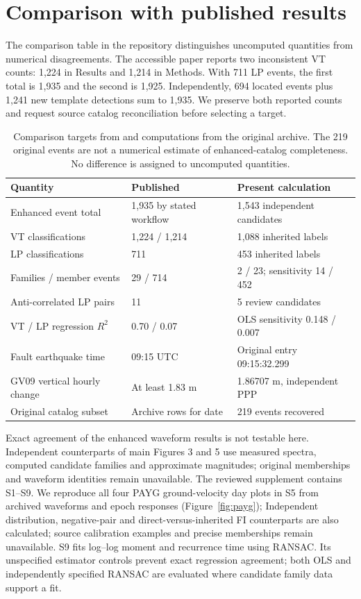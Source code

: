 \documentclass[11pt]{article}
\begin{document}
\section{Comparison with published results}
The comparison table in the repository distinguishes uncomputed quantities from numerical disagreements. The accessible paper reports two inconsistent VT counts: 1,224 in Results and 1,214 in Methods. With 711 LP events, the first total is 1,935 and the second is 1,925. Independently, 694 located events plus 1,241 new template detections sum to 1,935. We preserve both reported counts and request source catalog reconciliation before selecting a target.

\begin{table}[ht]\centering\small
\begin{tabular}{p{}p{}p{}}\toprule
Quantity & Published & Present calculation\\\midrule
Enhanced event total & 1,935 by stated workflow & 1,543 independent candidates\\
VT classifications & 1,224 / 1,214 & 1,088 inherited labels\\
LP classifications & 711 & 453 inherited labels\\
Families / member events & 29 / 714 & 2 / 23; sensitivity 14 / 452\\
Anti-correlated LP pairs & 11 & 5 review candidates\\
VT / LP regression $R^2$ & 0.70 / 0.07 & OLS sensitivity 0.148 / 0.007\\
Fault earthquake time & 09:15 UTC & Original entry 09:15:32.299\\
GV09 vertical hourly change & At least 1.83 m & 1.86707 m, independent PPP\\
Original catalog subset & Archive rows for date & 219 events recovered\\\bottomrule
\end{tabular}
\caption{Comparison targets from \citet{song2026} and computations from the original archive. The 219 original events are not a numerical estimate of enhanced-catalog completeness. No difference is assigned to uncomputed quantities.}
\end{table}

Exact agreement of the enhanced waveform results is not testable here. Independent counterparts of main Figures 3 and 5 use measured spectra, computed candidate families and approximate magnitudes; original memberships and waveform identities remain unavailable. The reviewed supplement contains S1--S9. We reproduce all four PAYG ground-velocity day plots in S5 from archived waveforms and epoch responses (Figure~\ref{fig:payg}); Independent distribution, negative-pair and direct-versus-inherited FI counterparts are also calculated; source calibration examples and precise memberships remain unavailable. S9 fits log--log moment and recurrence time using RANSAC. Its unspecified estimator controls prevent exact regression agreement; both OLS and independently specified RANSAC are evaluated where candidate family data support a fit.
\end{document}
